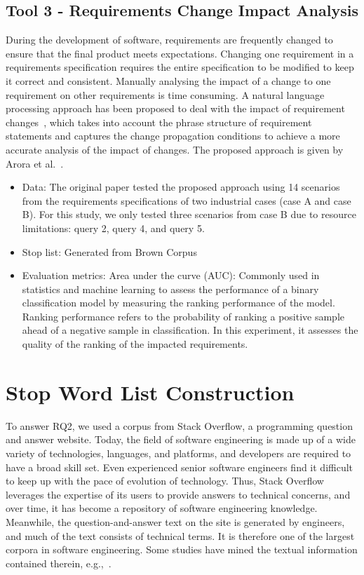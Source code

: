 \documentclass[conference]{IEEEtran}
\begin{document}
\begin{sloppy}
\subsection{Tool 3 - Requirements Change Impact Analysis}

During the development of software, requirements are frequently changed to ensure that the final product meets expectations. Changing one requirement in a requirements specification requires the entire specification to be modified to keep it correct and consistent. Manually analysing the impact of a change to one requirement on other requirements is time consuming. A natural language processing approach has been proposed to deal with the impact of requirement changes~\cite{arora2015change}, which takes into account the phrase structure of requirement statements and captures the change propagation conditions to achieve a more accurate analysis of the impact of changes. The proposed approach is given by Arora et al.~\cite{arora2015change,arora2015narcia}.

\begin{itemize}
\item Data: The original paper tested the proposed approach using 14 scenarios from the requirements specifications of two industrial cases (case A and case B). For this study, we only tested three scenarios from case B due to resource limitations: query 2, query 4, and query 5. 
\item Stop list: Generated from Brown Corpus 
\item Evaluation metrics: Area under the curve (AUC): Commonly used in statistics and machine learning to assess the performance of a binary classification model by measuring the ranking performance of the model. Ranking performance refers to the probability of ranking a positive sample ahead of a negative sample in classification. In this experiment, it assesses the quality of the ranking of the impacted requirements. 
\end{itemize}

\section{Stop Word List Construction}

To answer RQ2, we used a corpus from Stack Overflow, a programming question and answer website. Today, the field of software engineering is made up of a wide variety of technologies, languages, and platforms, and developers are required to have a broad skill set. Even experienced senior software engineers find it difficult to keep up with the pace of evolution of technology. Thus, Stack Overflow leverages the expertise of its users to provide answers to technical concerns, and over time, it has become a repository of software engineering knowledge. Meanwhile, the question-and-answer text on the site is generated by engineers, and much of the text consists of technical terms. It is therefore one of the largest corpora in software engineering. Some studies have mined the textual information contained therein, e.g.,~\cite{treude2016augmenting}. 
 

\end{sloppy}
\end{document}
